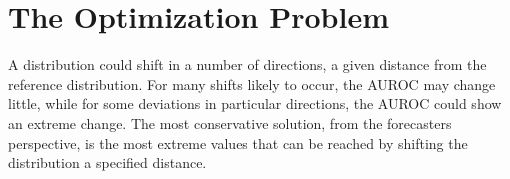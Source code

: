 




\section{The Optimization Problem} \label{sec:theory}




A distribution could shift in a number of directions, a given distance from the reference distribution.
For many shifts likely to occur, the AUROC may change little, while for some deviations in particular directions, the AUROC could show an extreme change.
The most conservative solution, from the forecasters perspective, is the most extreme values that can be reached by shifting the distribution a specified distance.



